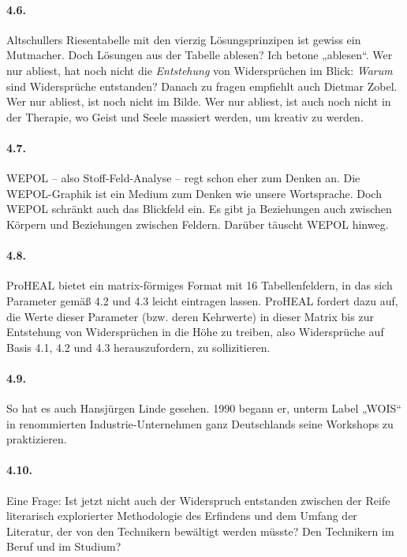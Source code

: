 \documentclass[12pt,a4paper]{article}
\begin{document}
\paragraph{4.6.}
Altschullers Riesentabelle mit den vierzig Lösungsprinzipen ist gewiss ein
Mutmacher. Doch Lösungen aus der Tabelle ablesen? Ich betone „ablesen“. Wer
nur abliest, hat noch nicht die \emph{Entstehung} von Widersprüchen im Blick:
\emph{Warum} sind Widersprüche entstanden? Danach zu fragen empfiehlt auch
Dietmar Zobel. Wer nur abliest, ist noch nicht im Bilde. Wer nur abliest, ist
auch noch nicht in der Therapie, wo Geist und Seele massiert werden, um
kreativ zu werden.

\paragraph{4.7.}
WEPOL – also Stoff-Feld-Analyse – regt schon eher zum Denken an. Die
WEPOL-Graphik ist ein Medium zum Denken wie unsere Wortsprache. Doch WEPOL
schränkt auch das Blickfeld ein. Es gibt ja Beziehungen auch zwischen Körpern
und Beziehungen zwischen Feldern. Darüber täuscht WEPOL hinweg.

\paragraph{4.8.}
ProHEAL bietet ein matrix-förmiges Format mit 16 Tabellenfeldern, in das
sich Parameter gemäß 4.2 und 4.3 leicht eintragen lassen. ProHEAL fordert dazu
auf, die Werte dieser Parameter (bzw. deren Kehrwerte) in dieser Matrix bis
zur Entstehung von Widersprüchen in die Höhe zu treiben, also Widersprüche
auf Basis 4.1, 4.2 und 4.3 herauszufordern, zu sollizitieren.

\paragraph{4.9.}
So hat es auch Hansjürgen Linde gesehen. 1990 begann er, unterm Label „WOIS“
in renommierten Industrie-Unternehmen ganz Deutschlands seine Workshops zu
praktizieren.

\paragraph{4.10.}
Eine Frage: Ist jetzt nicht auch der Widerspruch entstanden zwischen der
Reife literarisch explorierter Methodologie des Erfindens und dem Umfang der
Literatur, der von den Technikern bewältigt werden müsste? Den Technikern im
Beruf und im Studium?
\end{document}
